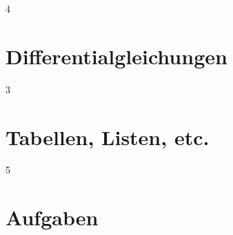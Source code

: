 \documentclass[8pt]{extarticle}
\begin{document}
\begin{multicols*}{4}
\section{Differentialgleichungen}





% 

\end{multicols*}

\newpage

\begin{multicols*}{3}
    \section{Tabellen, Listen, etc.}

    
\end{multicols*}

\newpage

\begin{multicols*}{5}
    \section{Aufgaben}

    

\end{multicols*}
\end{document}
